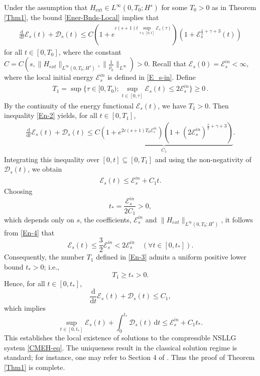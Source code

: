 \documentclass[reqno,11pt]{amsart}
\numberwithin{equation}{section}
\def\d{\mathrm{d}}
\begin{document}
Under the assumption that $H_{\text{ext}} \in L^\infty(0,T_0;H^s)$ for some $T_0 >0$ as in Theorem \ref{Thm1}, the bound \eqref{Ener-Bnds-Local} implies that
\begin{equation}\label{En-2}
\begin{aligned}
\frac{\d}{\d t} \mathcal{E}_s (t) + \mathcal{D}_s(t) \leq C (1 + e^{c(s+1)t \sup_{ \tau \in [0, t] } \mathcal{E}_s (\tau) }  ) ( 1 + \mathcal{E}_s^{ \frac{s}{2} + \gamma + 3 } (t) )
\end{aligned}
\end{equation}
for all $t \in [0,T_0]$, where the constant $C = C(s, \| H_{ext} \|_{L^\infty(0,T_0;H^s)}, \| \frac{1}{\rho_0} \|_{L^\infty} ) > 0$. Recall that $\mathcal{E}_s(0) = \mathcal{E}_s^{in} < \infty$, where the local initial energy $\mathcal{E}_s^{in}$ is defined in \eqref{E_s-in}. Define
\begin{equation}\label{En-3}
\begin{aligned}
T_1 = \sup\{\tau \in [0, T_0); \sup_{t \in [0,\tau]} \mathcal{E}_s (t) \leq 2 \mathcal{E}_s^{in}\} \geq 0 \,.
\end{aligned}
\end{equation}
By the continuity of the energy functional $\mathcal{E}_s(t)$, we have $T_1 > 0$. Then inequality \eqref{En-2} yields, for all $t \in [0, T_1]$,
\begin{equation*}
\begin{aligned}
\frac{\d}{\d t} \mathcal{E}_s(t) + \mathcal{D}_s(t) \leq \underbrace{ C \left( 1 + e^{2 c (s+1) T_0 \mathcal{E}_s^{in}} \right) \left( 1 + ( 2 \mathcal{E}_s^{in} )^{ \frac{s}{2} + \gamma + 3 } \right) }_{C_1} .
\end{aligned}
\end{equation*}
Integrating this inequality over $[0,t] \subseteq [0,T_1]$ and using the non-negativity of $\mathcal{D}_s(t)$, we obtain
\begin{equation}\label{En-4}
\begin{aligned}
\mathcal{E}_s(t) \leq \mathcal{E}_s^{in} + C_1 t.
\end{aligned}
\end{equation}
Choosing
\[
t_{*} = \frac{\mathcal{E}_s^{in}}{2 C_1} > 0,
\]
which depends only on $s$, the coefficients, $\mathcal{E}_s^{in}$ and $\|H_{ext}\|_{L^{\infty}(0,T_0;H^{s})}$, it follows from \eqref{En-4} that
\[
\mathcal{E}_s(t) \leq \frac{3}{2} \mathcal{E}_s^{in} < 2 \mathcal{E}_s^{in} \quad (\forall t \in [0, t_{*}]).
\]
Consequently, the number $T_1$ defined in \eqref{En-3} admits a uniform positive lower bound $t_{*} > 0$; i.e.,
\[
T_1 \geq t_{*} > 0.
\]
Hence, for all $t \in [0, t_{*}]$,
\[
\frac{\d}{\d t} \mathcal{E}_s(t) + \mathcal{D}_s(t) \leq C_1,
\]
which implies
\[
\sup_{t \in [0,t_{*}]} \mathcal{E}_s (t) + \int_{0}^{t_{*}} \mathcal{D}_s(t) \, \d t \leq \mathcal{E}_s^{in} + C_1 t_{*}.
\]
This establishes the local existence of solutions to the compressible NSLLG system \eqref{CMEH-eq}. The uniqueness result in the classical solution regime is standard; for instance, one may refer to Section 4 of \cite{JLM-CMS-2026}. Thus the proof of Theorem \ref{Thm1} is complete.
\end{document}
